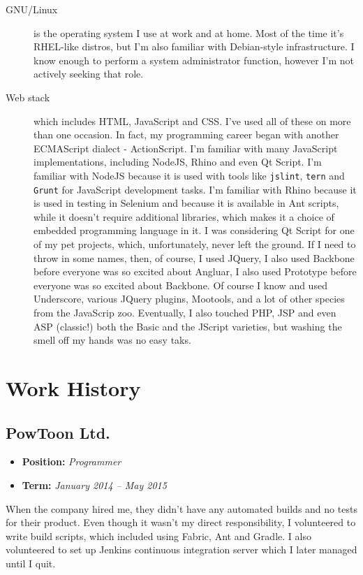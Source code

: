 \documentclass[11pt]{article}
\begin{document}
\begin{description}
\item[{GNU/Linux}] is the operating system I use at work and at home.  Most of
the time it's RHEL-like distros, but I'm also familiar with Debian-style
infrastructure.  I know enough to perform a system administrator function,
however I'm not actively seeking that role.
\item[{Web stack}] which includes HTML, JavaScript and CSS.  I've used all of
these on more than one occasion.  In fact, my programming career began
with another ECMAScript dialect - ActionScript.  I'm familiar with
many JavaScript implementations, including NodeJS, Rhino and even
Qt Script.  I'm familiar with NodeJS because it is used with tools
like \texttt{jslint}, \texttt{tern} and \texttt{Grunt} for JavaScript development tasks.
I'm familiar with Rhino because it is used in testing in Selenium
and because it is available in Ant scripts, while it doesn't require
additional libraries, which makes it a choice of embedded programming
language in it.  I was considering Qt Script for one of my pet projects,
which, unfortunately, never left the ground.
If I need to throw in some names, then, of course, I used JQuery, 
I also used Backbone before everyone was so excited about Angluar,
I also used Prototype before everyone was so excited about Backbone.
Of course I know and used Underscore, various JQuery plugins, Mootools,
and a lot of other species from the JavaScrip zoo.
Eventually, I also touched PHP, JSP and even ASP (classic!) both the
Basic and the JScript varieties, but washing the smell off my hands
was no easy taks.
\end{description}

\section{Work History}
\label{sec:orgheadline6}

\subsection{PowToon Ltd.}
\label{sec:orgheadline3}
\begin{itemize}
\item \textbf{Position:} \emph{Programmer}
\item \textbf{Term:} \emph{January 2014 – May 2015}
\end{itemize}

When the company hired me, they didn't have any automated builds and no tests
for their product.  Even though it wasn't my direct responsibility, I
volunteered to write build scripts, which included using Fabric, Ant and
Gradle.  I also volunteered to set up Jenkins continuous integration server
which I later managed until I quit.
\end{document}
